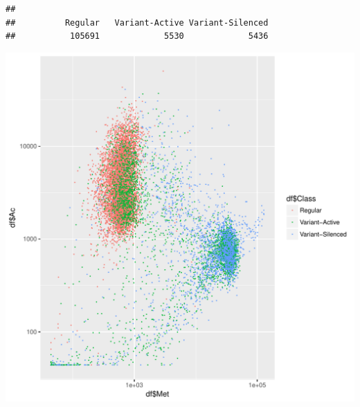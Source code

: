 \documentclass{article}\usepackage[]{graphicx}\usepackage[]{color}
\makeatletter
\newenvironment{kframe}{%
 \def\at@end@of@kframe{}%
 \ifinner\ifhmode%
  \def\at@end@of@kframe{\end{minipage}}%
  \begin{minipage}{\columnwidth}%
 \fi\fi%
 \def\FrameCommand##1{\hskip\@totalleftmargin \hskip-\fboxsep
 \colorbox{shadecolor}{##1}\hskip-\fboxsep
     \hskip-\linewidth \hskip-\@totalleftmargin \hskip\columnwidth}%
 \MakeFramed {\advance\hsize-\width
   \@totalleftmargin\z@ \linewidth\hsize
   \@setminipage}}%
 {\par\unskip\endMakeFramed%
 \at@end@of@kframe}
\newenvironment{knitrout}{}{} %
\makeatother
\begin{document}
\begin{knitrout}
\color{fgcolor}\begin{kframe}
\begin{verbatim}
## 
##          Regular   Variant-Active Variant-Silenced 
##           105691             5530             5436
\end{verbatim}
\end{kframe}
\includegraphics[width=1\linewidth]{figure/ac_met_log_status-1} 

\end{knitrout}
\end{document}
